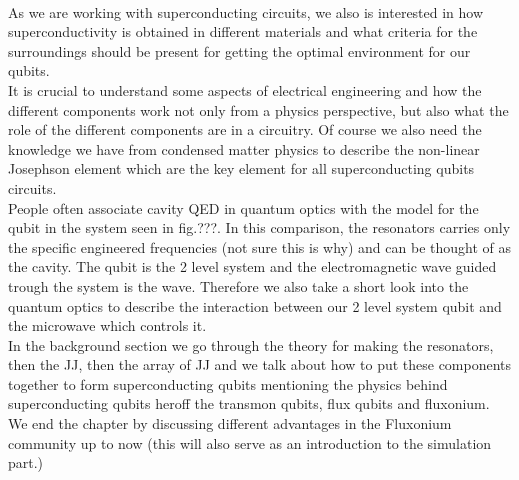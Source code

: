 \\
As we are working with superconducting circuits, we also is interested in how superconductivity is obtained in different materials and what criteria for the surroundings should be present for getting the optimal environment for our qubits. 
\\
It is crucial to understand some aspects of electrical engineering and how the different components work not only from a physics perspective, but also what the role of the different components are in a circuitry. Of course we also need the knowledge we have from condensed matter physics to describe the non-linear Josephson element which are the key element for all superconducting qubits circuits.
\\
People often associate cavity QED in quantum optics with the model for the qubit in the system seen in fig.???. In this comparison, the resonators carries only the specific engineered frequencies (not sure this is why) and can be thought of as the cavity. The qubit is the 2 level system and the electromagnetic wave guided trough the system is the wave. Therefore we also take a short look into the quantum optics to describe the interaction between our 2 level system qubit and the microwave which controls it.
\\
In the background section we go through the theory for making the resonators, then the JJ, then the array of JJ and we talk about how to put these components together to form superconducting qubits mentioning the physics behind superconducting qubits heroff the transmon qubits, flux qubits and fluxonium. We end the chapter by discussing different advantages in the Fluxonium community up to now (this will also serve as an introduction to the simulation part.)
